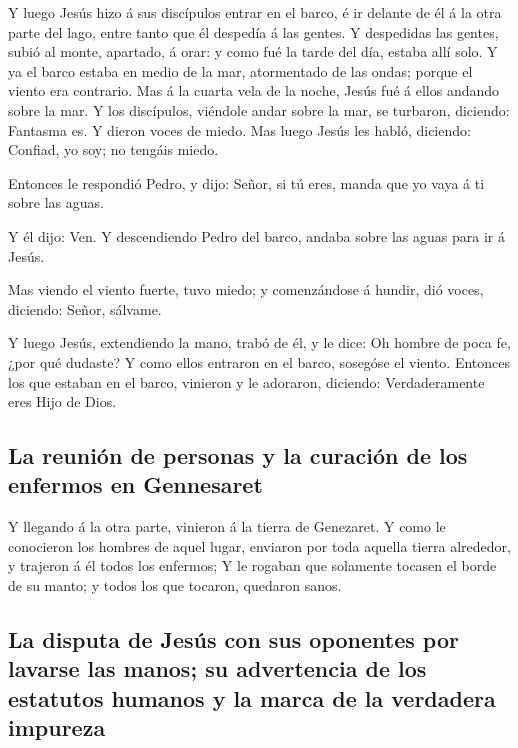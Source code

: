  Y luego Jesús hizo á sus discípulos entrar en el barco,
é ir delante de él á la otra parte del lago, entre tanto que él despedía
á las gentes.  Y despedidas las gentes, subió al monte,
apartado, á orar: y como fué la tarde del día, estaba allí solo.
 Y ya el barco estaba en medio de la mar, atormentado de
las ondas; porque el viento era contrario.  Mas á la
cuarta vela de la noche, Jesús fué á ellos andando sobre la mar.
 Y los discípulos, viéndole andar sobre la mar, se
turbaron, diciendo: Fantasma es. Y dieron voces de miedo.
 Mas luego Jesús les habló, diciendo: Confiad, yo soy; no
tengáis miedo.

 Entonces le respondió Pedro, y dijo: Señor, si tú eres,
manda que yo vaya á ti sobre las aguas.

 Y él dijo: Ven. Y descendiendo Pedro del barco, andaba
sobre las aguas para ir á Jesús.

 Mas viendo el viento fuerte, tuvo miedo; y comenzándose
á hundir, dió voces, diciendo: Señor, sálvame.

 Y luego Jesús, extendiendo la mano, trabó de él, y le
dice: Oh hombre de poca fe, ¿por qué dudaste?  Y como
ellos entraron en el barco, sosegóse el viento.  Entonces
los que estaban en el barco, vinieron y le adoraron, diciendo:
Verdaderamente eres Hijo de Dios.

\hypertarget{la-reuniuxf3n-de-personas-y-la-curaciuxf3n-de-los-enfermos-en-gennesaret}{%
\subsection{La reunión de personas y la curación de los enfermos en
Gennesaret}\label{la-reuniuxf3n-de-personas-y-la-curaciuxf3n-de-los-enfermos-en-gennesaret}}

 Y llegando á la otra parte, vinieron á la tierra de
Genezaret.  Y como le conocieron los hombres de aquel
lugar, enviaron por toda aquella tierra alrededor, y trajeron á él todos
los enfermos;  Y le rogaban que solamente tocasen el
borde de su manto; y todos los que tocaron, quedaron sanos.

\hypertarget{la-disputa-de-jesuxfas-con-sus-oponentes-por-lavarse-las-manos-su-advertencia-de-los-estatutos-humanos-y-la-marca-de-la-verdadera-impureza}{%
\subsection{La disputa de Jesús con sus oponentes por lavarse las manos;
su advertencia de los estatutos humanos y la marca de la verdadera
impureza}\label{la-disputa-de-jesuxfas-con-sus-oponentes-por-lavarse-las-manos-su-advertencia-de-los-estatutos-humanos-y-la-marca-de-la-verdadera-impureza}}

